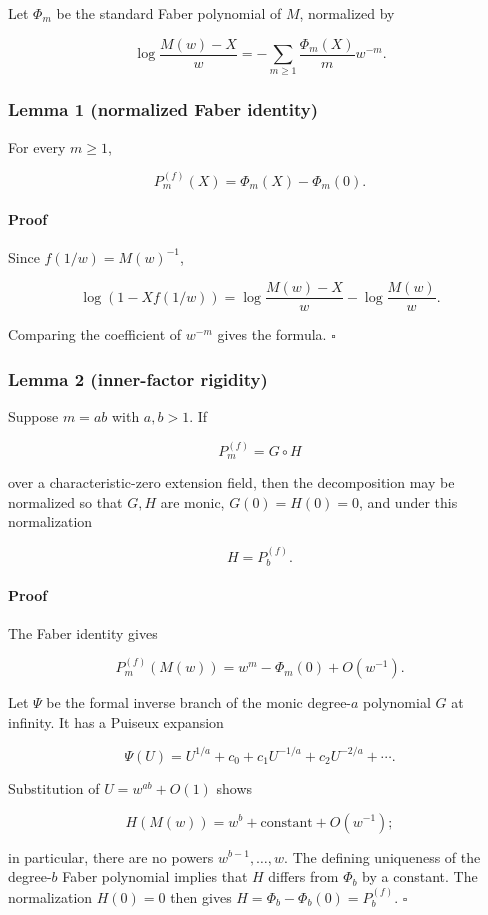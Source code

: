 \documentclass[11pt]{article}
\theoremstyle{keio}
\theoremstyle{definition}
\theoremstyle{remark}
\begin{document}
Let \(\Phi_m\) be the standard Faber polynomial of \(M\), normalized by

\[
 \log\frac{M(w)-X}{w}
 =-\sum_{m\geq1}\frac{\Phi_m(X)}m w^{-m}.
\]

\subsubsection{Lemma 1 (normalized Faber identity)}

For every \(m\geq1\),

\[
 P_m^{(f)}(X)=\Phi_m(X)-\Phi_m(0).
\]

\paragraph{Proof}

Since \(f(1/w)=M(w)^{-1}\),

\[
 \log(1-Xf(1/w))
 =\log\frac{M(w)-X}{w}-\log\frac{M(w)}w.
\]

Comparing the coefficient of \(w^{-m}\) gives the formula. \(\square\)

\subsubsection{Lemma 2 (inner-factor rigidity)}

Suppose \(m=ab\) with \(a,b>1\). If

\[
 P_m^{(f)}=G\circ H
\]

over a characteristic-zero extension field, then the decomposition may be
normalized so that \(G,H\) are monic, \(G(0)=H(0)=0\), and under this
normalization

\[
 H=P_b^{(f)}.
\]

\paragraph{Proof}

The Faber identity gives

\[
 P_m^{(f)}(M(w))=w^m-\Phi_m(0)+O(w^{-1}).
\]

Let \(\Psi\) be the formal inverse branch of the monic degree-\(a\)
polynomial \(G\) at infinity. It has a Puiseux expansion

\[
 \Psi(U)=U^{1/a}+c_0+c_1U^{-1/a}+c_2U^{-2/a}+\cdots .
\]

Substitution of \(U=w^{ab}+O(1)\) shows

\[
 H(M(w))=w^b+\text{constant}+O(w^{-1});
\]

in particular, there are no powers \(w^{b-1},\ldots,w\). The defining
uniqueness of the degree-\(b\) Faber polynomial implies that \(H\) differs
from \(\Phi_b\) by a constant. The normalization \(H(0)=0\) then gives
\(H=\Phi_b-\Phi_b(0)=P_b^{(f)}\). \(\square\)
\end{document}
